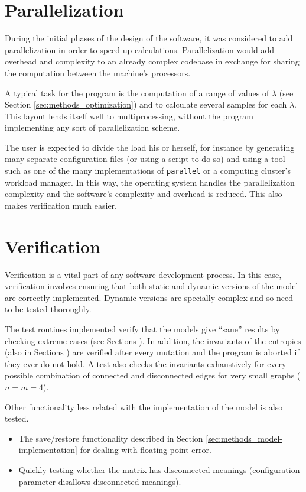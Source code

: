 \section{Parallelization}
\label{sec:methods_parallelization}

During the initial phases of the design of the software, it was considered to add parallelization in order to speed up calculations.
Parallelization would add overhead and complexity to an already complex codebase in exchange for sharing the computation between the machine's processors.

A typical task for the program is the computation of a range of values of $\lambda$ (see Section \ref{sec:methods_optimization}) and to calculate several samples for each $\lambda$.
This layout lends itself well to multiprocessing, without the program implementing any sort of parallelization scheme.

The user is expected to divide the load his or herself, for instance by generating many separate configuration files (or using a script to do so) and using a tool such as one of the many implementations of \texttt{parallel} or a computing cluster's workload manager.
In this way, the operating system handles the parallelization complexity and the software's complexity and overhead is reduced.
This also makes verification much easier.

\section{Verification}
\label{sec:methods_verification}

Verification is a vital part of any software development process.
In this case, verification involves ensuring that both static and dynamic versions of the model are correctly implemented.
Dynamic versions are specially complex and so need to be tested thoroughly.

The test routines implemented verify that the models give ``sane'' results by checking extreme cases (see Sections ).
In addition, the invariants of the entropies (also in Sections ) are verified after every mutation and the program is aborted if they ever do not hold.
A test also checks the invariants exhaustively for every possible combination of connected and disconnected edges for very small graphs ($n=m=4$).

Other functionality less related with the implementation of the model is also tested.
\begin{itemize}
\item The save/restore functionality described in Section \ref{sec:methods_model-implementation} for dealing with floating point error.
\item Quickly testing whether the matrix has disconnected meanings (configuration parameter disallows disconnected meanings).
\end{itemize}

